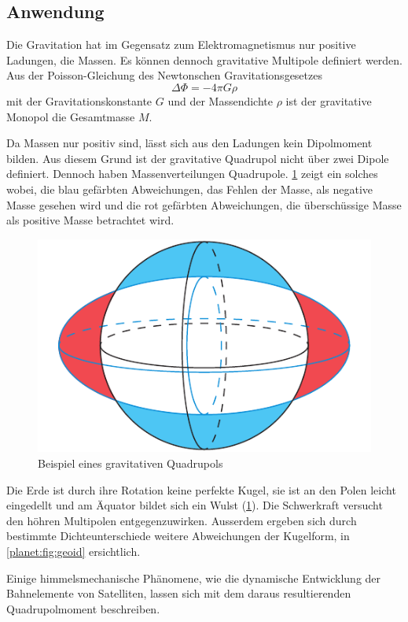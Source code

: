 \subsection{Anwendung
\label{planet:subsection:anwendung}}
Die Gravitation hat im Gegensatz zum Elektromagnetismus nur positive Ladungen, die Massen.
%
Es können dennoch gravitative Multipole definiert werden.
Aus der Poisson-Gleichung des Newtonschen Gravitationsgesetzes
\begin{equation*}
    \Delta \Phi = -4\pi G\rho
\end{equation*}
mit der Gravitationskonstante \(G\) und der Massendichte \(\rho\) ist der gravitative Monopol die Gesamtmasse \(M\).

Da Massen nur positiv sind, lässt sich aus den Ladungen kein Dipolmoment bilden.
%
Aus diesem Grund ist der gravitative Quadrupol nicht über zwei Dipole definiert.
%
Dennoch haben Massenverteilungen Quadrupole.
\cref{planet:fig:quadroearth} zeigt ein solches wobei, die blau gefärbten Abweichungen, das Fehlen der Masse, als negative Masse gesehen wird und die rot gefärbten Abweichungen, die überschüssige Masse als positive Masse betrachtet wird.  
\begin{figure}
    \centering
    \includegraphics[width=0.60\linewidth]{papers/planet/pictures/Quadroearth.pdf}
    \caption{Beispiel eines gravitativen Quadrupols
        \label{planet:fig:quadroearth}}
\end{figure}
\begin{beispiel}
    Die Erde ist durch ihre Rotation keine perfekte Kugel, sie ist an den Polen leicht eingedellt und am Äquator bildet sich ein Wulst (\cref{planet:fig:quadroearth}).
    Die Schwerkraft versucht den höhren Multipolen entgegenzuwirken.
    Ausserdem ergeben sich durch bestimmte Dichteunterschiede weitere Abweichungen der Kugelform, in \cref{planet:fig:geoid} ersichtlich.
\end{beispiel}

Einige himmelsmechanische Phänomene, wie die dynamische Entwicklung der Bahnelemente von Satelliten, lassen sich mit dem daraus resultierenden Quadrupolmoment beschreiben.
